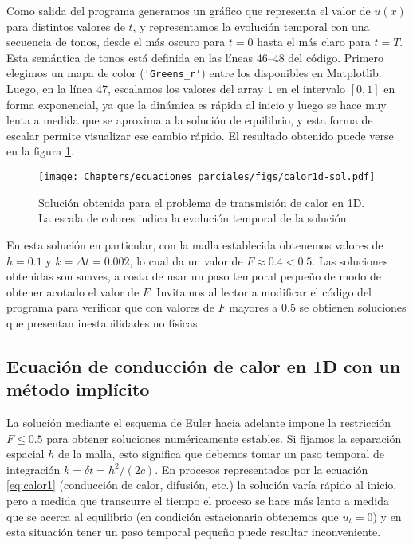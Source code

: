 Como salida del programa generamos un gráfico que representa el valor de $u(x)$ para distintos valores de $t$, y representamos la evolución temporal con una secuencia de tonos, desde el más oscuro para $t=0$ hasta el más claro para $t=T$. Esta semántica de tonos está definida en las líneas 46--48 del código. Primero elegimos un mapa de color (\verb|'Greens_r'|) entre los disponibles en Matplotlib. Luego, en la línea 47, escalamos los valores del array \verb|t| en el intervalo $[0,1]$ en forma exponencial, ya que la dinámica es rápida al inicio y luego se hace muy lenta a medida que se aproxima a la solución de equilibrio, y esta forma de escalar permite visualizar ese cambio rápido. El resultado obtenido puede verse en la figura \ref{fig:calor1Dsol}.

\begin{figure}[ht]
 \centering
 \texttt{[image: Chapters/ecuaciones\_parciales/figs/calor1d-sol.pdf]}
 \caption{Solución obtenida para el problema de transmisión de calor en 1D. La escala de colores indica la evolución temporal de la solución.}
 \label{fig:calor1Dsol}
\end{figure}

En esta solución en particular, con la malla establecida obtenemos valores de $h = 0.1$ y $k = \Delta t = 0.002$, lo cual da un valor de $F \approx 0.4 < 0.5$. Las soluciones obtenidas son suaves, a costa de usar un paso temporal pequeño de modo de obtener acotado el valor de $F$. Invitamos al lector a modificar el código del programa para verificar que con valores de $F$ mayores a $0.5$ se obtienen soluciones que presentan inestabilidades no físicas.

\subsection{Ecuación de conducción de calor en 1D con un método implícito} \label{subsec:calor_implicito}
La solución mediante el esquema de Euler hacia adelante impone la restricción $F \leq 0.5$ para obtener soluciones numéricamente estables. Si fijamos la separación espacial $h$ de la malla, esto significa que debemos tomar un paso temporal de integración $k = \delta t = h^2/(2c)$. En procesos representados por la ecuación \eqref{eq:calor1} (conducción de calor, difusión, etc.) la solución varía rápido al inicio, pero a medida que transcurre el tiempo el proceso se hace más lento a medida que se acerca al equilibrio (en condición estacionaria obtenemos que $u_t = 0$) y en esta situación tener un paso temporal pequeño puede resultar inconveniente. 

